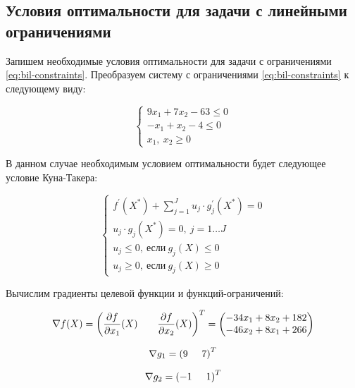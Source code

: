 \subsection{Условия оптимальности для задачи с линейными ограничениями}

Запишем необходимые условия оптимальности для задачи с ограничениями \ref{eq:bil-constraints}. Преобразуем систему с ограничениями \ref{eq:bil-constraints} к следующему виду:

\begin{equation*}
	\begin{cases}
		9 x_1 + 7 x_2 - 63 \leq 0
		\\
		-x_1 + x_2 - 4 \leq 0
		\\
		x_1,\ x_2 \geq 0
	\end{cases}
\end{equation*}

В данном случае необходимым условием оптимальности будет следующее условие Куна-Такера:

\begin{equation}
\label{eq:kt}
	\begin{cases}
		f^{'}(X^*) + \sum\limits_{j = 1}^J u_j \cdot g^{'}_j(X^*) = 0
		\\
		u_j \cdot g_j(X^*) = 0,\ j = 1 \dots J
		\\
		u_j \leq 0,\ \text{если}\ g_j(X) \leq 0
		\\
		u_j \geq 0,\ \text{если}\ g_j(X) \geq 0
	\end{cases}
\end{equation}

Вычислим градиенты целевой функции и функций-ограничений:

\begin{equation*}
	\nabla f(X) = \left(  \frac{\partial f}{\partial x_1}(X) \hspace{7mm} \frac{\partial f}{\partial x_2}(X) \right)^T = \begin{pmatrix}
		-34 x_1 + 8 x_2 + 182
		\\
		-46 x_2 + 8 x_1 + 266
	\end{pmatrix}
\end{equation*}

\begin{equation*}
	\nabla g_1 = \left( 9 \hspace{5mm} 7 \right)^T
\end{equation*}

\begin{equation*}
	\nabla g_2 = \left( -1 \hspace{5mm} 1 \right)^T
\end{equation*}

